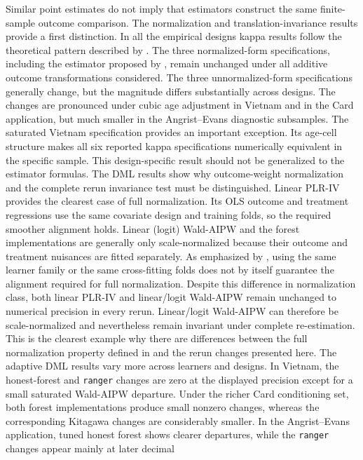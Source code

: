 \documentclass[12pt, a4paper, oneside]{article}
\theoremstyle{plain}
\theoremstyle{definition}
\begin{document}
Similar point estimates do not imply that estimators construct the same
finite-sample outcome comparison. The normalization and
translation-invariance results provide a first distinction.
In all the empirical designs kappa results follow the theoretical pattern described by
\citet{sloczynski2025abadie}. The three normalized-form specifications,
including the estimator proposed by \citet{uysal2011three}, remain unchanged
under all additive outcome transformations considered. The three
unnormalized-form specifications generally change, but the magnitude differs
substantially across designs. The changes are pronounced under cubic age
adjustment in Vietnam and in the Card application, but much smaller in the
Angrist--Evans diagnostic subsamples. 
The saturated Vietnam specification provides an important exception. Its
age-cell structure makes all six reported kappa specifications numerically
equivalent in the specific sample. 
 This
design-specific result should not be generalized to the estimator formulas.
The DML results show why outcome-weight normalization and the complete rerun invariance test must be distinguished. Linear PLR-IV provides the
clearest case of full normalization. Its OLS outcome and treatment regressions
use the same covariate design and training folds, so the required smoother
alignment holds. Linear (logit) Wald-AIPW and the forest implementations are
generally only scale-normalized because their outcome and treatment nuisances
are fitted separately. As emphasized by
\citet[Sections~4.2.2 and~4.2.4]{knaus2024treatment}, using the same learner
family or the same cross-fitting folds does not by itself guarantee the
alignment required for full normalization.
Despite this difference in normalization class, both linear PLR-IV and
linear/logit Wald-AIPW remain unchanged to numerical precision in every rerun.
Linear/logit Wald-AIPW can
therefore be scale-normalized and nevertheless remain invariant under
complete re-estimation. This is the clearest example why there are differences between the full normalization property defined in \citet{knaus2024treatment} and the rerun changes presented here.
The adaptive DML results vary more across learners and designs. In Vietnam,
the honest-forest and \texttt{ranger} changes are zero at the displayed
precision except for a small saturated Wald-AIPW departure. Under the richer
Card conditioning set, both forest implementations produce small nonzero
changes, whereas the corresponding Kitagawa changes are considerably smaller.
In the Angrist--Evans application, tuned honest forest shows clearer
departures, while the \texttt{ranger} changes appear mainly at later decimal
\end{document}
